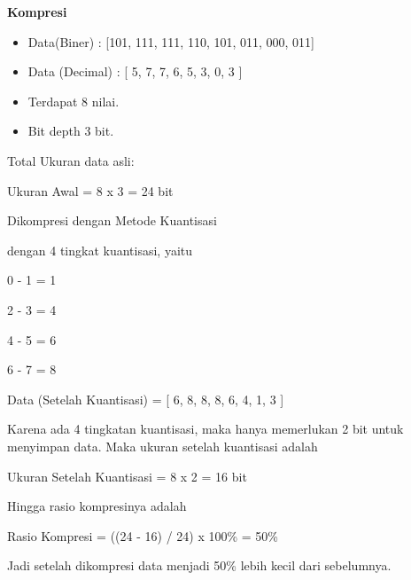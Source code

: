 \documentclass[12pt,a4paper]{article}
\begin{document}
\textbf{Kompresi}

\begin{itemize}
  \item Data(Biner) : [101, 111, 111, 110, 101, 011, 000, 011]
  \item Data (Decimal) : [ 5, 7, 7, 6, 5, 3, 0, 3 ]
  \item Terdapat 8 nilai.
  \item Bit depth 3 bit.
\end{itemize}

Total Ukuran data asli:

\begin{center}
  Ukuran Awal = 8 x 3 = 24 bit
\end{center}

Dikompresi dengan Metode Kuantisasi

dengan 4 tingkat kuantisasi, yaitu

\begin{center}

  0 - 1 = 1 

  2 - 3 = 4 

  4 - 5 = 6 

  6 - 7 = 8

\end{center}

Data (Setelah Kuantisasi) = [ 6, 8, 8, 8, 6, 4, 1, 3 ]

\vspace{1cm}

Karena ada 4 tingkatan kuantisasi, maka hanya memerlukan 2 bit untuk
menyimpan data. Maka ukuran setelah kuantisasi adalah

\begin{center}
  Ukuran Setelah Kuantisasi = 8 x 2 = 16 bit
\end{center}

Hingga rasio kompresinya adalah

\begin{center}
  Rasio Kompresi = ((24 - 16) / 24) x 100\% = 50\%
\end{center}

Jadi setelah dikompresi data menjadi 50\% lebih kecil dari sebelumnya.
\end{document}
